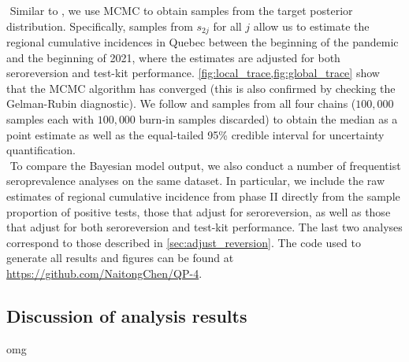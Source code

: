 \newline$ $
Similar to \cite{meyer2022adjusting}, we use MCMC to obtain samples from the target posterior distribution. Specifically, samples from $s_{2j}$ for all $j$ allow us to estimate the regional cumulative incidences in Quebec between the beginning of the pandemic and the beginning of 2021, where the estimates are adjusted for both seroreversion and test-kit performance. \cref{fig:local_trace,fig:global_trace} show that the MCMC algorithm has converged (this is also confirmed by checking the Gelman-Rubin diagnostic). We follow \cite{meyer2022adjusting} and samples from all four chains ($100,000$ samples each with $100,000$ burn-in samples discarded) to obtain the median as a point estimate as well as the equal-tailed 95\% credible interval for uncertainty quantification.\\
\newline$ $
To compare the Bayesian model output, we also conduct a number of frequentist seroprevalence analyses on the same dataset. In particular, we include the raw estimates of regional cumulative incidence from phase II directly from the sample proportion of positive tests, those that adjust for seroreversion, as well as those that adjust for both seroreversion and test-kit performance. The last two analyses correspond to those described in \cref{sec:adjust_reversion}. The code used to generate all results and figures can be found at \url{https://github.com/NaitongChen/QP-4}.

\subsection{Discussion of analysis results}
omg


